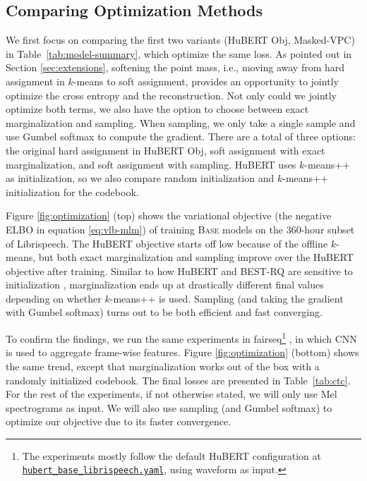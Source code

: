 \subsection{Comparing Optimization Methods}
\label{sec:opt}

We first focus on comparing the first two variants (HuBERT Obj, Masked-VPC) in Table~\ref{tab:model-summary}, which optimize the same loss.
As pointed out in Section \ref{sec:extensions}, softening the point mass, i.e., moving away from hard assignment in $k$-means to soft assignment, provides an opportunity to jointly optimize the cross entropy and the reconstruction.
Not only could we jointly optimize both terms, we also have the option to choose between exact marginalization and sampling.
When sampling, we only take a single sample and use Gumbel softmax to compute the gradient.
There are a total of three options: the original hard assignment in HuBERT Obj, soft assignment with exact marginalization, and soft assignment with sampling.
HuBERT uses $k$-means++ \citep{arthur2006k} as initialization, so we also compare random initialization and $k$-means++ initialization for the codebook.

Figure \ref{fig:optimization} (top) shows the variational objective (the negative ELBO in equation \ref{eq:vlb-mlm}) of training \textsc{Base} models on the 360-hour subset of Librispeech.
The HuBERT objective starts off low because of the offline $k$-means, but both exact marginalization and sampling improve over the HuBERT objective after training.
Similar to how HuBERT and BEST-RQ are sensitive to initialization \cite{chiu2022self}, marginalization ends up at drastically different final values depending on whether $k$-means++ is used.
Sampling (and taking the gradient with Gumbel softmax) turns out to be both efficient and fast converging.

To confirm the findings, we run the same experiments in fairseq\footnote{The experiments mostly follow
the default HuBERT configuration 
at \href{https://github.com/facebookresearch/fairseq/blob/main/examples/hubert/config/pretrain/hubert_base_librispeech.yaml}{\texttt{hubert\_base\_librispeech.yaml}},
using waveform as input.}
,
in which CNN is used to aggregate frame-wise features.
Figure \ref{fig:optimization} (bottom) shows the same trend, except that marginalization works out of the box with a randomly initialized codebook.
The final losses are presented in Table~\ref{tab:ctc}.
For the rest of the experiments, if not otherwise stated, we will only use Mel spectrograms as input.
We will also use sampling (and Gumbel softmax) to optimize our objective due to its faster convergence.


